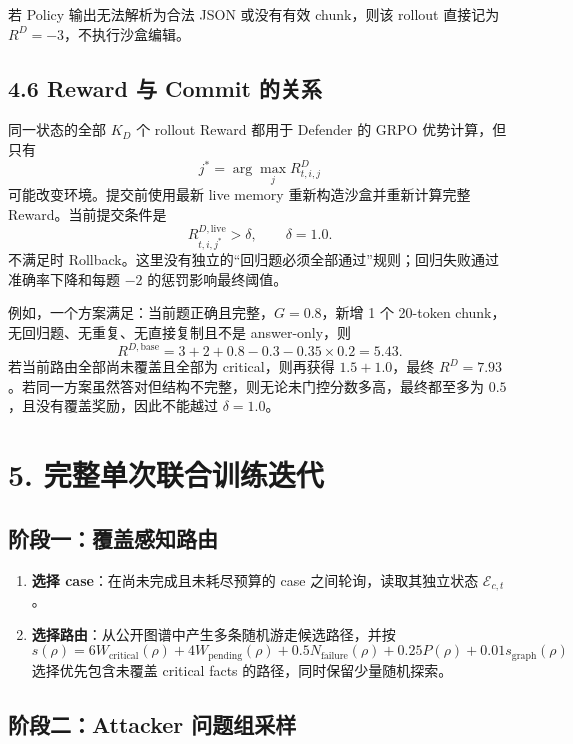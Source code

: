 \documentclass[a4paper,11pt]{article}
\begin{document}
若 Policy 输出无法解析为合法 JSON 或没有有效 chunk，则该 rollout 直接记为
$R^D=-3$，不执行沙盒编辑。

\subsection*{4.6 Reward 与 Commit 的关系}

同一状态的全部 $K_D$ 个 rollout Reward 都用于 Defender 的 GRPO 优势计算，但只有
\[
    j^*=\arg\max_j R^D_{t,i,j}
\]
可能改变环境。提交前使用最新 live memory 重新构造沙盒并重新计算完整 Reward。当前提交条件是
\[
    R^{D,\mathrm{live}}_{t,i,j^*}>\delta,
    \qquad \delta=1.0.
\]
不满足时 Rollback。这里没有独立的“回归题必须全部通过”规则；回归失败通过准确率下降和每题 $-2$ 的惩罚影响最终阈值。

例如，一个方案满足：当前题正确且完整，$G=0.8$，新增 1 个 20-token
chunk，无回归题、无重复、无直接复制且不是 answer-only，则
\[
    R^{D,\mathrm{base}}
    =3+2+0.8-0.3-0.35\times0.2
    =5.43.
\]
若当前路由全部尚未覆盖且全部为 critical，则再获得 $1.5+1.0$，最终
$R^D=7.93$。若同一方案虽然答对但结构不完整，则无论未门控分数多高，最终都至多为
$0.5$，且没有覆盖奖励，因此不能越过 $\delta=1.0$。

\section*{5. 完整单次联合训练迭代}

\subsection*{阶段一：覆盖感知路由}

\begin{enumerate}
    \item \textbf{选择 case}：在尚未完成且未耗尽预算的 case 之间轮询，读取其独立状态 $\mathcal{E}_{c,t}$。

    \item \textbf{选择路由}：从公开图谱中产生多条随机游走候选路径，并按
    \[
        s(\rho)
        =6W_{\mathrm{critical}}(\rho)
        +4W_{\mathrm{pending}}(\rho)
        +0.5N_{\mathrm{failure}}(\rho)
        +0.25P(\rho)
        +0.01s_{\mathrm{graph}}(\rho)
    \]
    选择优先包含未覆盖 critical facts 的路径，同时保留少量随机探索。
\end{enumerate}

\subsection*{阶段二：Attacker 问题组采样}
\end{document}
